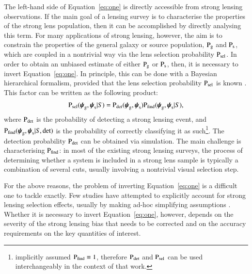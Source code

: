 \documentclass{aa}
\def\psilens{\boldsymbol{\psi}_\mathrm{g}}
\def\psisource{\boldsymbol{\psi}_\mathrm{s}}
\def\prlens{{\rm P}_\mathrm{g}}
\def\prsource{{\rm P}_\mathrm{s}}
\def\pdet{{\rm P}_\mathrm{det}}
\def\psel{{\rm P}_\mathrm{sel}}
\def\pfind{{\rm P}_\mathrm{find}}
\def\Eref#1{Equation~\ref{#1}\xspace}
\begin{document}
The left-hand side of \Eref{eq:one} is directly accessible from strong lensing observations. If the main goal of a lensing survey is to characterise the properties of the strong lens population, then it can be accomplished by directly analysing this term. For many applications of strong lensing, however, the aim is to constrain the properties of the general galaxy or source population, $\prlens$ and $\prsource$, which are coupled in a nontrivial way via the lens selection probability $\psel$.
In order to obtain an unbiased estimate of either $\prlens$ or $\prsource$, then, it is necessary to invert \Eref{eq:one}.
In principle, this can be done with a Bayesian hierarchical formalism, provided that the lens selection probability $\psel$ is known \citep{Son22}.
This factor can be written as the following product:
\begin{equation}\label{eq:two}
\psel(\psilens,\psisource|S) = \pdet(\psilens,\psisource)\pfind(\psilens,\psisource|S),%
\end{equation}
where $\pdet$ is the probability of detecting a strong lensing event, and $\pfind(\psilens,\psisource|S,\mathrm{det})$ is the probability of correctly classifying it as such\footnote{\citet{Son22} implicitly assumed $\pfind\equiv1$, therefore $\pdet$ and $\psel$ can be used interchangeably in the context of that work.}.
The detection probability $\pdet$ can be obtained via simulation. The main challenge is characterising $\pfind$: in most of the existing strong lensing surveys, the process of determining whether a system is included in a strong lens sample is typically a combination of several cuts, usually involving a nontrivial visual selection step.

For the above reasons, the problem of inverting \Eref{eq:one} is a difficult one to tackle exactly.
Few studies have attempted to explicitly account for strong lensing selection effects, usually by making ad-hoc simplifying assumptions \citep{Son++15,O+A17,Son++19}.
Whether it is necessary to invert \Eref{eq:one}, however, depends on the severity of the strong lensing bias that needs to be corrected and on the accuracy requirements on the key quantities of interest.
\end{document}
